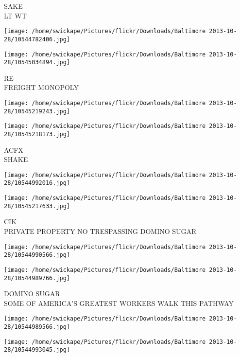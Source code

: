 \documentclass[10pt,letterpaper]{article}
\begin{document}
SAKE\\
LT WT\\
\pagebreak

\texttt{[image: /home/swickape/Pictures/flickr/Downloads/Baltimore 2013-10-28/10544782406.jpg]}

\vspace{0.25in}
\texttt{[image: /home/swickape/Pictures/flickr/Downloads/Baltimore 2013-10-28/10545034894.jpg]}

RE\\
FREIGHT MONOPOLY\\
\pagebreak

\texttt{[image: /home/swickape/Pictures/flickr/Downloads/Baltimore 2013-10-28/10545219243.jpg]}

\vspace{0.25in}
\texttt{[image: /home/swickape/Pictures/flickr/Downloads/Baltimore 2013-10-28/10545218173.jpg]}

ACFX\\
SHAKE\\
\pagebreak

\texttt{[image: /home/swickape/Pictures/flickr/Downloads/Baltimore 2013-10-28/10544992016.jpg]}

\vspace{0.25in}
\texttt{[image: /home/swickape/Pictures/flickr/Downloads/Baltimore 2013-10-28/10545217633.jpg]}

CIK\\
PRIVATE PROPERTY NO TRESPASSING DOMINO SUGAR\\
\pagebreak

\texttt{[image: /home/swickape/Pictures/flickr/Downloads/Baltimore 2013-10-28/10544990566.jpg]}

\vspace{0.25in}
\texttt{[image: /home/swickape/Pictures/flickr/Downloads/Baltimore 2013-10-28/10544989766.jpg]}

DOMINO SUGAR\\
SOME OF AMERICA'S GREATEST WORKERS WALK THIS PATHWAY\\
\pagebreak

\texttt{[image: /home/swickape/Pictures/flickr/Downloads/Baltimore 2013-10-28/10544989566.jpg]}

\vspace{0.25in}
\texttt{[image: /home/swickape/Pictures/flickr/Downloads/Baltimore 2013-10-28/10544993045.jpg]}
\end{document}
